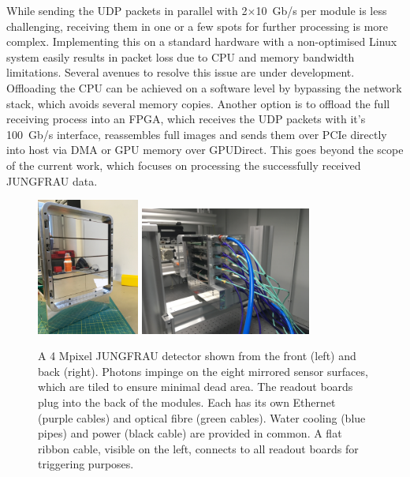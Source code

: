 \documentclass[a4paper]{article}
\begin{document}
While sending the UDP packets in parallel with 2$\times$10~Gb/s per module is less challenging, receiving them in one or a few spots for further processing is more complex. Implementing this on a standard hardware with a non-optimised Linux system easily results in packet loss due to CPU and memory bandwidth limitations. Several avenues to resolve this issue are under development. Offloading the CPU can be achieved on a software level by bypassing the network stack, which avoids several memory copies. Another option is to offload the full receiving process into an FPGA, which receives the UDP packets with it's 100~Gb/s interface, reassembles full images and sends them over PCIe directly into host via DMA or GPU memory over GPUDirect. This goes beyond the scope of the current work, which focuses on processing the successfully received JUNGFRAU data.

\begin{figure}[h!]
\centering
\includegraphics[width=0.30\textwidth]{jungfraudetector.jpg}
\hfill
\includegraphics[width=0.50\textwidth]{JF4M_back.jpg}
\caption{A 4 Mpixel JUNGFRAU detector shown from the front (left) and back (right). Photons impinge on the eight mirrored sensor surfaces, which are tiled to ensure minimal dead area. The readout boards plug into the back of the modules. Each has its own Ethernet (purple cables) and optical fibre (green cables). Water cooling (blue pipes) and power (black cable) are provided in common. A flat ribbon cable, visible on the left, connects to all readout boards for triggering purposes.}
\label{fig:jfdetector}
\end{figure}
\end{document}
